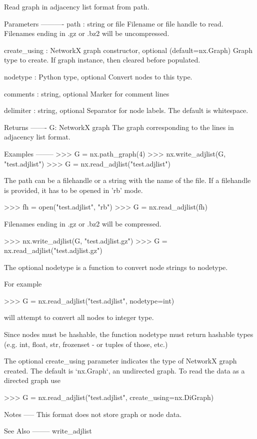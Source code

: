 \begin{DoxyVerb}Read graph in adjacency list format from path.

Parameters
----------
path : string or file
   Filename or file handle to read.
   Filenames ending in .gz or .bz2 will be uncompressed.

create_using : NetworkX graph constructor, optional (default=nx.Graph)
   Graph type to create. If graph instance, then cleared before populated.

nodetype : Python type, optional
   Convert nodes to this type.

comments : string, optional
   Marker for comment lines

delimiter : string, optional
   Separator for node labels.  The default is whitespace.

Returns
-------
G: NetworkX graph
    The graph corresponding to the lines in adjacency list format.

Examples
--------
>>> G = nx.path_graph(4)
>>> nx.write_adjlist(G, "test.adjlist")
>>> G = nx.read_adjlist("test.adjlist")

The path can be a filehandle or a string with the name of the file. If a
filehandle is provided, it has to be opened in 'rb' mode.

>>> fh = open("test.adjlist", "rb")
>>> G = nx.read_adjlist(fh)

Filenames ending in .gz or .bz2 will be compressed.

>>> nx.write_adjlist(G, "test.adjlist.gz")
>>> G = nx.read_adjlist("test.adjlist.gz")

The optional nodetype is a function to convert node strings to nodetype.

For example

>>> G = nx.read_adjlist("test.adjlist", nodetype=int)

will attempt to convert all nodes to integer type.

Since nodes must be hashable, the function nodetype must return hashable
types (e.g. int, float, str, frozenset - or tuples of those, etc.)

The optional create_using parameter indicates the type of NetworkX graph
created.  The default is `nx.Graph`, an undirected graph.
To read the data as a directed graph use

>>> G = nx.read_adjlist("test.adjlist", create_using=nx.DiGraph)

Notes
-----
This format does not store graph or node data.

See Also
--------
write_adjlist
\end{DoxyVerb}
 \mbox{\label{namespacenetworkx_1_1readwrite_1_1adjlist_a924db60cfb8b93c123c4c1be8a09bf68}} 
